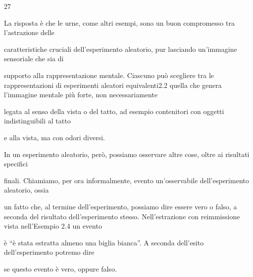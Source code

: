 \documentclass[a4paper,portrait,12pt]{article}
\begin{document}
27





\begin{flushleft}
La risposta \`{e} che le urne, come altri esempi, sono un buon compromesso tra l'astrazione delle
\end{flushleft}


\begin{flushleft}
caratteristiche cruciali dell'esperimento aleatorio, pur lasciando un'immagine sensoriale che sia di
\end{flushleft}


\begin{flushleft}
supporto alla rappresentazione mentale. Ciascuno pu\`{o} scegliere tra le rappresentazioni di esperimenti aleatori equivalenti2.2 quella che genera l'immagine mentale più forte, non necessariamente
\end{flushleft}


\begin{flushleft}
legata al senso della vista o del tatto, ad esempio contenitori con oggetti indistinguibili al tatto
\end{flushleft}


\begin{flushleft}
e alla vista, ma con odori diversi.
\end{flushleft}


\begin{flushleft}
In un esperimento aleatorio, per\`{o}, possiamo osservare altre cose, oltre ai risultati specifici
\end{flushleft}


\begin{flushleft}
finali. Chiamiamo, per ora informalmente, evento un'osservabile dell'esperimento aleatorio, ossia
\end{flushleft}


\begin{flushleft}
un fatto che, al termine dell'esperimento, possiamo dire essere vero o falso, a seconda del risultato dell'esperimento stesso. Nell'estrazione con reimmissione vista nell'Esempio 2.4 un evento
\end{flushleft}


\begin{flushleft}
\`{e} {``}\`{e} stata estratta almeno una biglia bianca''. A seconda dell'esito dell'esperimento potremo dire
\end{flushleft}


\begin{flushleft}
se questo evento \`{e} vero, oppure falso.
\end{flushleft}
\end{document}
